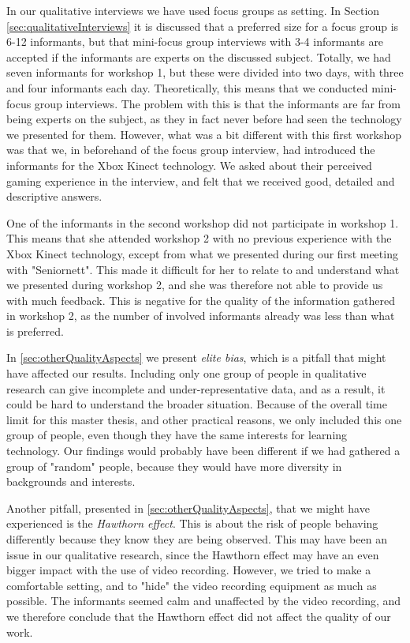 In our qualitative interviews we have used focus groups as setting. In Section \ref{sec:qualitativeInterviews} it is discussed that a preferred size for a focus group is 6-12 informants, but that mini-focus group interviews with 3-4 informants are accepted if the informants are experts on the discussed subject. Totally, we had seven informants for workshop 1, but these were divided into two days, with three and four informants each day. Theoretically, this means that we conducted mini-focus group interviews. The problem with this is that the informants are far from being experts on the subject, as they in fact never before had seen the technology we presented for them. However, what was a bit different with this first workshop was that we, in beforehand of the focus group interview, had introduced the informants for the Xbox Kinect technology. We asked about their perceived gaming experience in the interview, and felt that we received good, detailed and descriptive answers. 

One of the informants in the second workshop did not participate in workshop 1. This means that she attended workshop 2 with no previous experience with the Xbox Kinect technology, except from what we presented during our first meeting with "Seniornett". This made it difficult for her to relate to and understand what we presented during workshop 2, and she was therefore not able to provide us with much feedback. This is negative for the quality of the information gathered in workshop 2, as the number of involved informants already was less than what is preferred. 

In \ref{sec:otherQualityAspects} we present \emph{elite bias}, which is a pitfall that might have affected our results. Including only one group of people in qualitative research can give incomplete and under-representative data, and as a result, it could be hard to understand the broader situation. Because of the overall time limit for this master thesis, and other practical reasons, we only included this one group of people, even though they have the same interests for learning technology. Our findings would probably have been different if we had gathered a group of "random" people, because they would have more diversity in backgrounds and interests.

Another pitfall, presented in \ref{sec:otherQualityAspects}, that we might have experienced is the \emph{Hawthorn effect}. This is about the risk of people behaving differently because they know they are being observed. This may have been an issue in our qualitative research, since the Hawthorn effect may have an even bigger impact with the use of video recording. However, we tried to make a comfortable setting, and to "hide" the video recording equipment as much as possible. The informants seemed calm and unaffected by the video recording, and we therefore conclude that the Hawthorn effect did not affect the quality of our work. 

